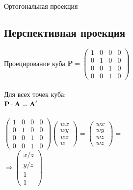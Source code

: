 \documentclass[10pt]{beamer}
\begin{document}
\begin{frame}{Ортогональная проекция}
  \end{frame}
  
  
  \subsection{Перспективная проекция}
  

  
  \begin{frame}{Проецирование куба}
  	{
  	}
  	{
  		$\textbf{P}=
  		\begin{pmatrix}
  			1&0&0&0\\
  			0&1&0&0\\
  			0&0&1&0\\
  			0&0&1&0
  		\end{pmatrix}$\\~\\
  		Для всех точек куба:\\
  		$ \textbf P \cdot \textbf A =\textbf A'$ \\ ~ \\
  		
  		$
  		\begin{pmatrix}
  			1&0&0&0\\
  			0&1&0&0\\
  			0&0&1&0\\
  			0&0&1&0
  		\end{pmatrix}
  		\begin{pmatrix}
  			wx\\
  			wy\\
  			wz\\
  			w
  		\end{pmatrix}
  		=	
  		\begin{pmatrix}
  			wx\\
  			wy\\
  			wz\\
  			wz
  		\end{pmatrix}
  		= $ \\ 
  		$ \Rightarrow
  		\begin{pmatrix}
  			x/z\\
  			y/z\\
  			1\\
  			1
  		\end{pmatrix}
  		$
  	}
  	
  \end{frame}
  
\end{document}
